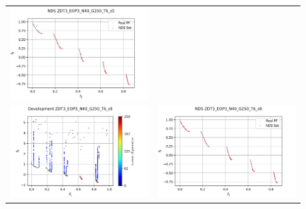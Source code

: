 \begin{figure}[H]
\begin{tabular}{c c}
    \includegraphics[scale=0.5]{figures/ZDT3_EOP3_N40_G250_T6/s5_nds.png}\\
    \includegraphics[scale=0.5]{figures/ZDT3_EOP3_N40_G250_T6/s8_dev.png} &
    \includegraphics[scale=0.5]{figures/ZDT3_EOP3_N40_G250_T6/s8_nds.png}\\

\end{tabular}
\end{figure}
